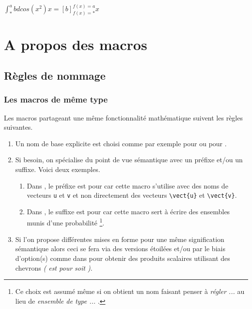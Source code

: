 \documentclass[12pt,a4paper]{article}
\newcommand\dintegrate[4]{%
  \int_{#1}^{#2} #3 d#4%
}
\newcommand\hook[4]{%
	\left[ #3 \right]_{#4=#1}^{#4=#2}%
}
\begin{document}
\begin{latexex}
$\dintegrate*{a}{b}{cos(x^2)}{x}
 =
 \hook*{a}{b}{f(x)}{x}$
\end{latexex}




\section{A propos des macros}

\subsection{Règles de nommage}

\subsubsection{Les macros de même \og type \fg}

Les macros partageant une même fonctionnalité mathématique suivent les règles suivantes.
\begin{enumerate}
	\item Un nom de base explicite est choisi comme par exemple  pour  ou  pour .

	\item Si besoin, on spécialise du point de vue sémantique avec un préfixe et/ou un suffixe. Voici deux exemples.
	\begin{enumerate}
		\item Dans , le préfixe  est pour  car cette macro s'utilise avec des noms de vecteurs \verb+u+ et \verb+v+ et non directement des vecteurs \verb+\vect{u}+ et \verb+\vect{v}+.

		\item Dans , le suffixe  est pour  car cette macro sert à écrire des ensembles munis d'une probabilité
	      \footnote{
	      	Ce choix est assumé même si on obtient un nom faisant penser à \emph{\og régler ... \fg} au lieu de \emph{\og ensemble de type ... \fg}.
		  }.
	\end{enumerate}

	\item Si l'on propose différentes mises en forme pour une même signification sémantique alors ceci se fera via des versions étoilées et/ou par le biais d'option(s) comme dans  pour obtenir des produits scalaires utilisant des chevrons \emph{( est pour  soit )}.
\end{enumerate}
\end{document}
